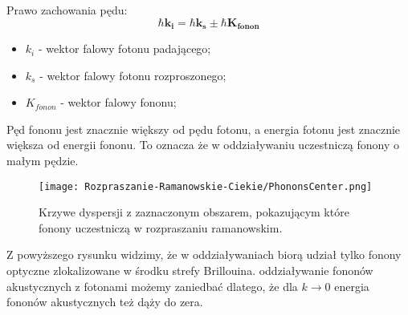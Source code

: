 Prawo zachowania pędu:
\begin{equation}
	\hbar \mathbf{k_{i}} = \hbar \mathbf{k_{s}} \pm \hbar \mathbf{K_{fonon}}
\end{equation}
\begin{itemize}	
	\item $k_{i}$ - wektor falowy fotonu padającego;
	\item $k_{s}$ - wektor falowy fotonu rozproszonego;
	\item $K_{fonon}$ - wektor falowy fononu;
\end{itemize}

Pęd fononu jest znacznie większy od pędu fotonu, a energia fotonu jest 
znacznie większa od energii fononu. To oznacza że w oddziaływaniu uczestniczą fonony o małym pędzie.

\begin{figure}[H]
	\begin{center}
		\texttt{[image: Rozpraszanie-Ramanowskie-Ciekie/PhononsCenter.png]}
		\caption{Krzywe dyspersji z zaznaczonym obszarem, pokazującym które fonony uczestniczą w rozpraszaniu ramanowskim.}
	\end{center}
\end{figure}

Z powyższego rysunku widzimy, że w oddziaływaniach biorą udział tylko  fonony optyczne zlokalizowane w środku strefy Brillouina. oddziaływanie fononów akustycznych z fotonami możemy zaniedbać dlatego, że dla $k \rightarrow 0$ energia fononów akustycznych też dąży do zera.

